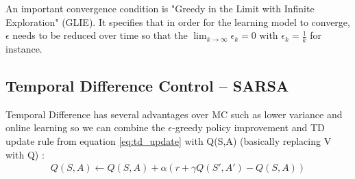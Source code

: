 An important convergence condition is "Greedy in the
Limit with Infinite Exploration" \cite{lecture_mfc} 
(GLIE). It specifies that in order for the learning model
to converge, $\epsilon$ needs to be reduced over time 
so that the $\lim_{k \to \infty} \epsilon_{k} = 0$ with $\epsilon_{k} = \frac{1}{k}$ for instance.






\subsection{Temporal Difference Control -- SARSA}
Temporal Difference has several advantages over MC such as lower variance and online learning so we can combine the $\epsilon$-greedy policy improvement and TD update rule from equation \ref{eq:td_update} with Q(S,A) \cite{lecture_mfc} (basically replacing V with Q) :
\begin{align}
    Q(S, A) \longleftarrow Q(S, A) + \alpha (r + \gamma Q(S', A') - Q(S, A)) \label{eq:sarsa_update_rule}
\end{align}

